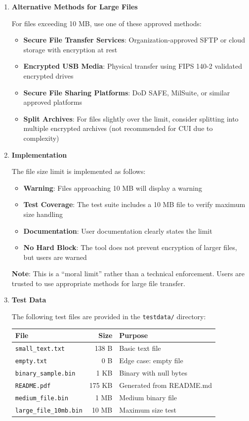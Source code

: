 \documentclass[11pt,letterpaper]{article}
\newcommand{\dmsection}[1]{\item \textbf{#1}\par}
\begin{document}
\begin{enumerate}
\dmsection{Alternative Methods for Large Files}

For files exceeding 10 MB, use one of these approved methods:

\begin{itemize}
    \item \textbf{Secure File Transfer Services}: Organization-approved SFTP or cloud storage with encryption at rest
    \item \textbf{Encrypted USB Media}: Physical transfer using FIPS 140-2 validated encrypted drives
    \item \textbf{Secure File Sharing Platforms}: DoD SAFE, MilSuite, or similar approved platforms
    \item \textbf{Split Archives}: For files slightly over the limit, consider splitting into multiple encrypted archives (not recommended for CUI due to complexity)
\end{itemize}

\dmsection{Implementation}

The file size limit is implemented as follows:

\begin{itemize}
    \item \textbf{Warning}: Files approaching 10 MB will display a warning
    \item \textbf{Test Coverage}: The test suite includes a 10 MB file to verify maximum size handling
    \item \textbf{Documentation}: User documentation clearly states the limit
    \item \textbf{No Hard Block}: The tool does not prevent encryption of larger files, but users are warned
\end{itemize}

\textbf{Note}: This is a ``moral limit'' rather than a technical enforcement. Users are trusted to use appropriate methods for large file transfer.

\dmsection{Test Data}

The following test files are provided in the \texttt{testdata/} directory:

\begin{tabularx}{\textwidth}{|l|r|X|}
\hline
\textbf{File} & \textbf{Size} & \textbf{Purpose} \\
\hline
\texttt{small\_text.txt} & 138 B & Basic text file \\
\hline
\texttt{empty.txt} & 0 B & Edge case: empty file \\
\hline
\texttt{binary\_sample.bin} & 1 KB & Binary with null bytes \\
\hline
\texttt{README.pdf} & 175 KB & Generated from README.md \\
\hline
\texttt{medium\_file.bin} & 1 MB & Medium binary file \\
\hline
\texttt{large\_file\_10mb.bin} & 10 MB & Maximum size test \\
\hline
\end{tabularx}


\end{enumerate}
\end{document}
